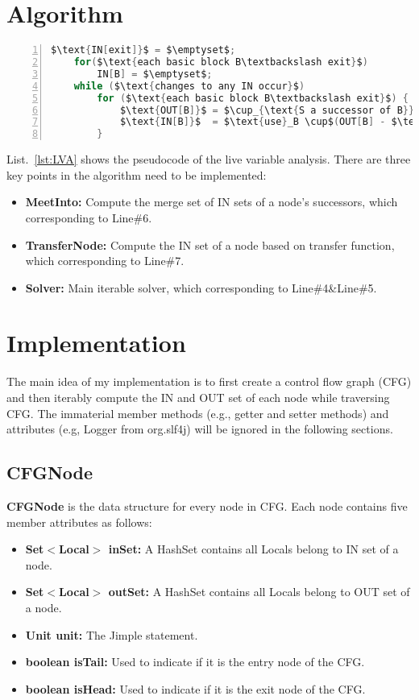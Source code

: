 \documentclass[conference]{IEEEtran}
\begin{document}
\section{Algorithm}
\begin{lstlisting}[label=lst:LVA, caption=Algorithm for LiveVariableAnalysis, language=java, mathescape=true, numbers=left]
    $\text{IN[exit]}$ = $\emptyset$;
    for($\text{each basic block B\textbackslash exit}$)
        IN[B] = $\emptyset$;
    while ($\text{changes to any IN occur}$)
        for ($\text{each basic block B\textbackslash exit}$) {
            $\text{OUT[B]}$ = $\cup_{\text{S a successor of B}}$ IN[S];
            $\text{IN[B]}$  = $\text{use}_B \cup$(OUT[B] - $\text{def}_B$);
        }
\end{lstlisting}
List.~\ref{lst:LVA} shows the pseudocode of the live variable analysis. There are three key points in the algorithm need to be implemented:
\begin{itemize}
    \item \textbf{MeetInto: } Compute the merge set of IN sets of a node's successors, which corresponding to Line\#6.
    \item \textbf{TransferNode: }Compute the IN set of a node based on transfer function, which corresponding to Line\#7.
    \item \textbf{Solver: }  Main iterable solver, which corresponding to Line\#4\&Line\#5.
\end{itemize}


\section{Implementation}\label{sec:imp}
The main idea of my implementation is to first create a control flow graph (CFG) and then iterably compute the IN and OUT set of each node while traversing CFG.
The immaterial member methods (e.g., getter and setter methods) and attributes (e.g, Logger from org.slf4j) will be ignored in the following sections.

\subsection{CFGNode}
\textbf{CFGNode} is the data structure for every node in CFG.
 Each node contains five member attributes as follows:

\begin{itemize}
    \item \textbf{Set$<$Local$>$ inSet: } A HashSet contains all Locals belong to IN set of a node.
    \item \textbf{Set$<$Local$>$ outSet: } A HashSet contains all Locals belong to OUT set of a node.
    \item \textbf{Unit unit: } The Jimple statement. 
    \item \textbf{boolean isTail: } Used to indicate if it is the entry node of the CFG.
    \item \textbf{boolean isHead: } Used to indicate if it is the exit node of the CFG.
\end{itemize}
\end{document}
